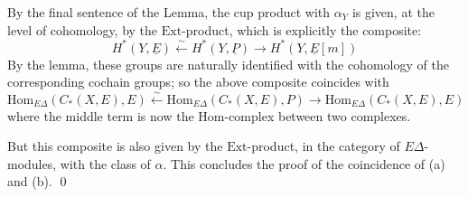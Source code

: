 \documentclass[10pt]{amsart}
\newcommand{\Ext}{\mathrm{Ext}}
\newcommand{\Hom}{\mathrm{Hom}}
\theoremstyle{remark}
\begin{document}
  
By the final sentence of the Lemma, the cup product with $\alpha_Y$ is given, at the level of cohomology, by the  $\Ext$-product, which is explicitly
the composite:
 $$H^*(Y, \underline{E}) \stackrel{\sim}{ \leftarrow} H^*(Y, \underline{P}) \rightarrow H^*(Y, \underline{E}[m])$$
 By the lemma, these groups are naturally identified with the cohomology of the corresponding 
 cochain groups; so the above composite coincides with $$\Hom_{E \Delta} (C_*(X, E), E) \stackrel{\sim}{\leftarrow} \Hom_{E \Delta}(C_*(X, E), P) \rightarrow \Hom_{E \Delta}(C_*(X, E), E)$$
 where the middle term is now the $\mathrm{Hom}$-complex between two complexes. 
 
But this composite is also given by the $\Ext$-product, in the category of $E \Delta$-modules, with the class of
$\alpha$. This concludes the proof of the coincidence of (a) and (b).  \qed
   
 \printindex
 
    
 
    
 
  
  
   
  
\end{document}

